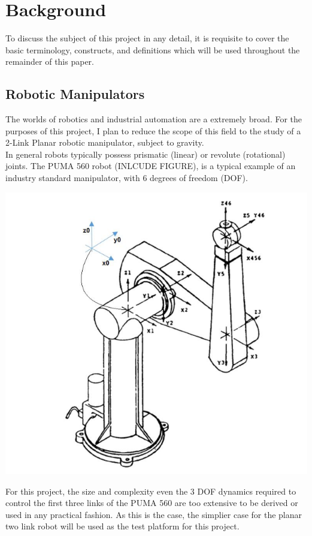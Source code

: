 \documentclass[journal]{IEEEtran}
\begin{document}
\section{Background}
To discuss the subject of this project in any detail, it is requisite to cover the basic terminology, constructs, and definitions which will be used throughout the remainder of this paper.

\subsection{Robotic Manipulators}

The worlds of robotics and industrial automation are a extremely broad. For the purposes of this project, I plan to reduce the scope of this field to the study of a 2-Link Planar robotic manipulator, subject to gravity. \\

In general robots typically possess prismatic (linear) or revolute (rotational) joints. The PUMA 560 robot (INLCUDE FIGURE), is a typical example of an industry standard manipulator, with 6 degrees of freedom (DOF).

\includegraphics[scale=.5]{./images/puma}

For this project, the size and complexity even the 3 DOF  dynamics required to control the first three links of the PUMA 560 are too extensive to be derived or used in any practical fashion. As this is the case, the simplier case for the planar two link robot will be used as the test platform for this project. 
\end{document}
